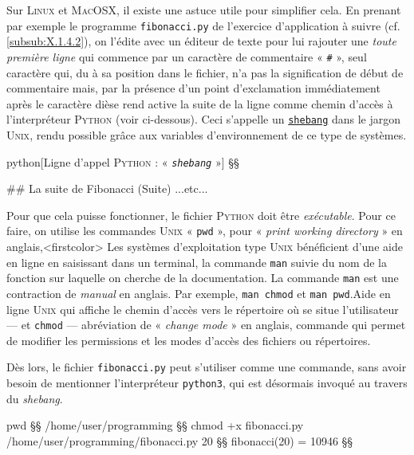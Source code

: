 Sur \textsc{Linux} et \textsc{MacOSX}, il existe une astuce utile pour simplifier cela. En prenant par exemple le programme \texttt{fibonacci.py} de l'exercice d'application à suivre (cf. \cref{subsub:X.1.4.2}), on l'édite avec un éditeur de texte pour lui rajouter une \emph{toute première ligne} qui commence par un caractère de commentaire « \texttt{\#} », seul caractère qui, du à sa position dans le fichier, n'a pas la signification de début de commentaire mais, par la présence d'un point d'exclamation immédiatement après le caractère dièse rend active la suite de la ligne comme chemin d'accès à l'interpréteur \textsc{Python} (voir ci-dessous). Ceci s'appelle un \href{https://en.wikipedia.org/wiki/Shebang_%28Unix%29}{\texttt{shebang}} dans le jargon \textsc{Unix}, rendu possible grâce aux variables d’environnement de ce type de systèmes.

\begin{code}{python}[Ligne d'appel \textsc{Python} : « \textit{\texttt{shebang}} »]
§\pyshebang§

## La suite de Fibonacci (Suite)
...etc...
\end{code}


Pour que cela puisse fonctionner, le fichier \textsc{Python} doit être \emph{exécutable}. 
Pour ce faire, on utilise les commandes \textsc{Unix} « \texttt{pwd} », pour « \textit{print working directory} » en anglais,\caution[c]<firstcolor>{%
Les systèmes d'exploitation type \textsc{Unix} bénéficient d'une aide en ligne en saisissant dans un terminal, la commande \texttt{man} suivie du nom de la fonction sur laquelle on cherche de la documentation. La commande \texttt{man} est une contraction de \textit{manual} en anglais. Par exemple, \texttt{man chmod} et \texttt{man pwd}.}{Aide en ligne \textsc{Unix}}
qui affiche le chemin d'accès vers le répertoire où se situe l'utilisateur --- et \texttt{chmod} --- abréviation de « \textit{change mode} » en anglais, commande qui permet de modifier les permissions et les modes d'accès des fichiers ou répertoires. 

Dès lors, le fichier \texttt{fibonacci.py} peut s'utiliser comme une commande, sans avoir besoin de mentionner l'interpréteur \texttt{python3}, qui est désormais invoqué au travers du \textit{shebang}.
\vspace*{4pt}
\begin{ubuntu}
pwd §\startconsole§
/home/user/programming §§
chmod +x fibonacci.py
/home/user/programming/fibonacci.py 20 §\startconsole§
fibonacci(20) = 10946 §§
\end{ubuntu}
\vspace*{4pt}

